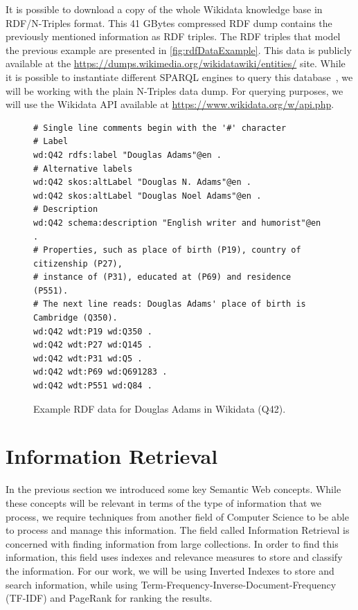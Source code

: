 It is possible to download a copy of the whole Wikidata knowledge base in RDF/N-Triples format. This 41 GBytes compressed RDF dump contains the previously mentioned information as RDF triples. The RDF triples that model the previous example are presented in \autoref{fig:rdfDataExample}. This data is publicly available at the \url{https://dumps.wikimedia.org/wikidatawiki/entities/} site. While it is possible to instantiate different SPARQL engines to query this database~\cite{Hernandez2016}, we will be working with the plain N-Triples data dump. For querying purposes, we will use the Wikidata API available at \url{https://www.wikidata.org/w/api.php}.

\begin{figure}[H]
\begin{verbatim}
# Single line comments begin with the '#' character
# Label
wd:Q42 rdfs:label "Douglas Adams"@en . 
# Alternative labels
wd:Q42 skos:altLabel "Douglas N. Adams"@en .
wd:Q42 skos:altLabel "Douglas Noel Adams"@en .
# Description
wd:Q42 schema:description "English writer and humorist"@en .
# Properties, such as place of birth (P19), country of citizenship (P27), 
# instance of (P31), educated at (P69) and residence (P551).
# The next line reads: Douglas Adams' place of birth is Cambridge (Q350).
wd:Q42 wdt:P19 wd:Q350 .
wd:Q42 wdt:P27 wd:Q145 .
wd:Q42 wdt:P31 wd:Q5 .
wd:Q42 wdt:P69 wd:Q691283 .
wd:Q42 wdt:P551 wd:Q84 .
\end{verbatim}
\caption{Example RDF data for Douglas Adams in Wikidata (Q42).}
\label{fig:rdfDataExample}
\end{figure}


\section{Information Retrieval}

In the previous section we introduced some key Semantic Web concepts. While these concepts will be relevant in terms of the type of information that we process, we require techniques from another field of Computer Science to  be able to process and manage this information. The field called Information Retrieval is concerned with finding information from large collections. In order to find this information, this field uses indexes and relevance measures to store and classify the information. For our work, we will be using Inverted Indexes to store and search information, while using Term-Frequency-Inverse-Document-Frequency (TF-IDF) and PageRank for ranking the results.

